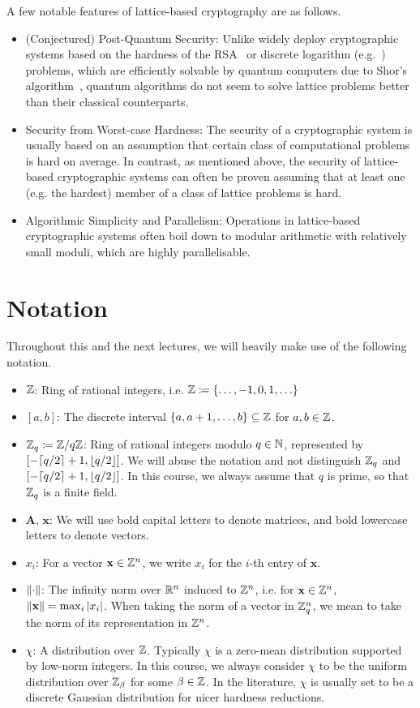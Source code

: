 \documentclass[10pt,twoside]{article}
\renewcommand{\vec}[1]{\mathbf{#1}}
\newcommand{\mat}[1]{\mathbf{#1}}
\begin{document}
A few notable features of lattice-based cryptography are as follows.
\begin{itemize}
    \item (Conjectured) Post-Quantum Security: Unlike widely deploy cryptographic systems based on the hardness of the RSA~\cite{RivShaAdl78} or discrete logarithm (e.g.~\cite{DifHel76}) problems, which are efficiently solvable by quantum computers due to Shor's algorithm~\cite{Sho97}, quantum algorithms do not seem to solve lattice problems better than their classical counterparts.
    \item Security from Worst-case Hardness: The security of a cryptographic system is usually based on an assumption that certain class of computational problems is hard on average. In contrast, as mentioned above, the security of lattice-based cryptographic systems can often be proven assuming that at least one (e.g. the hardest) member of a class of lattice problems is hard.
    \item Algorithmic Simplicity and Parallelism: Operations in lattice-based cryptographic systems often boil down to modular arithmetic with relatively small moduli, which are highly parallelisable.
\end{itemize}

\section{Notation}

Throughout this and the next lectures, we will heavily make use of the following notation.
\begin{itemize}
    \item $\mathbb{Z}$: Ring of rational integers, i.e. $\mathbb{Z} \coloneqq \left\{\ldots,-1,0,1,\ldots\right\}$
    \item $[a,b]$: The discrete interval $\left\{a,a+1,\ldots,b\right\} \subseteq \mathbb{Z}$ for $a, b \in \mathbb{Z}$.
    \item $\mathbb{Z}_q \coloneqq \mathbb{Z}/q\mathbb{Z}$: Ring of rational integers modulo $q \in \mathbb{N}$, represented by $[-\ceil{q/2}+1, \floor{q/2}]$. We will abuse the notation and not distinguish $\mathbb{Z}_q$ and $[-\ceil{q/2}+1, \floor{q/2}]$. In this course, we always assume that $q$ is prime, so that $\mathbb{Z}_q$ is a finite field.
    \item $\mat{A}$, $\vec{x}$: We will use bold capital letters to denote matrices, and bold lowercase letters to denote vectors.
    \item $x_i$: For a vector $\vec{x} \in \ZZ^n$, we write $x_i$ for the $i$-th entry of $\vec{x}$.
    \item $\left\lVert\cdot\right\rVert$: The infinity norm over $\mathbb{R}^n$ induced to $\mathbb{Z}^n$, i.e. for $\vec{x} \in \ZZ^n$, $\norm{\vec{x}} = \max_i |x_i|$. When taking the norm of a vector in $\mathbb{Z}_q^n$, we mean to take the norm of its representation in $\mathbb{Z}^n$.
    \item $\chi$: A distribution over $\mathbb{Z}$. Typically $\chi$ is a zero-mean distribution supported by low-norm integers. In this course, we always consider $\chi$ to be the uniform distribution over $\mathbb{Z}_\beta$ for some $\beta \in \mathbb{Z}$. In the literature, $\chi$ is usually set to be a discrete Gaussian distribution for nicer hardness reductions.
\end{itemize}
\end{document}
